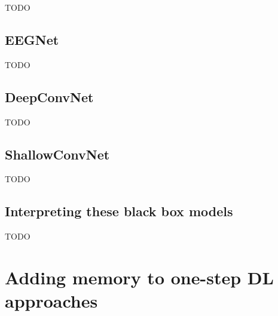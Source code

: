 
TODO


\subsection{EEGNet}
\label{subsec:offline_bci_system_one_step_dl_eegnet}

TODO


\subsection{DeepConvNet}
\label{subsec:offline_bci_system_one_step_dl_deepconvnet}

TODO


\subsection{ShallowConvNet}
\label{subsec:offline_bci_system_one_step_dl_shallowconvnet}

TODO


\subsection{Interpreting these black box models}
\label{subsec:offline_bci_system_one_step_dl_interpreting}

TODO

\section{Adding memory to one-step DL approaches}
\label{sec:offline_bci_system_adding_memory}

